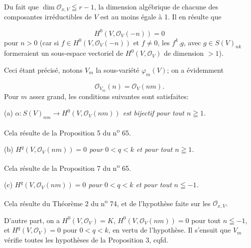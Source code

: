 Du fait que $\dim \mathcal{O}_{x,V} \leqq r - 1$, la dimension algébrique de chacune des composantes irréductibles de $V$ est au moins égale à 1. Il en résulte que

\begin{equation*}
H^0(V, \mathcal{O}_V(-n)) = 0
\end{equation*}
pour $n > 0$ (car si $f \in H^0(V, \mathcal{O}_V(-n))$ et $f \neq 0$, les $f^k.g$, avec $g \in S(V)_{nk}$ formeraient un sous-espace vectoriel de $H^0(V, \mathcal{O}_V)$ de dimension $>1$).

Ceci étant précisé, notons $V_m$ la sous-variété $\varphi_m(V)$; on a évidemment

\begin{equation*}
\mathcal{O}_{V_m}(n) = \mathcal{O}_V(nm).
\end{equation*}
Pour $m$ assez grand, les conditions suivantes sont satisfaites:

(a) \textit{$\alpha : S(V)_{nm} \to H^0(V, \mathcal{O}_V(nm))$ est bijectif pour tout $n \geqq 1$.}

Cela résulte de la Proposition 5 du n\textsuperscript{o} 65.

(b) \textit{$H^q(V, \mathcal{O}_V(nm)) = 0$ pour $0 < q < k$ et pour tout $n \geqq 1$.}

Cela résulte de la Proposition 7 du n\textsuperscript{o} 65.

(c) \textit{$H^q(V, \mathcal{O}_V(nm)) = 0$ pour $0 < q < k$ et pour tout $n \leqq -1$.}

Cela résulte du Théorème 2 du n\textsuperscript{o} 74, et de l'hypothèse faite sur les $\mathcal{O}_{x,V}$.



%
%
%
D'autre part, on a $H^0(V, \mathcal{O}_V) = K$, $H^0(V, \mathcal{O}_V(nm)) = 0$ pour tout $n \leqq -1$, et $H^q(V, \mathcal{O}_V) = 0$ pour $0 < q < k$, en vertu de l'hypothèse. Il s'ensuit que $V_m$ vérifie toutes les hypothèses de la Proposition 3, cqfd.

